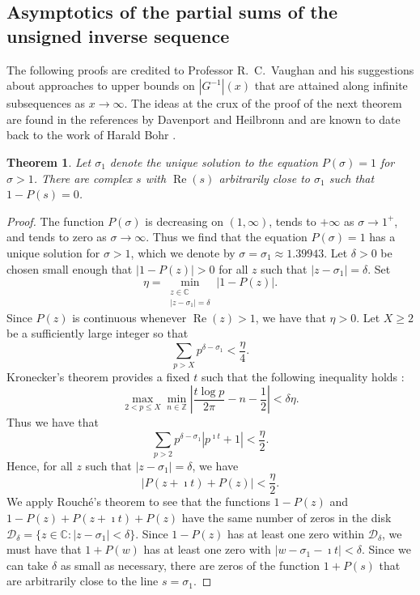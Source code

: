 \documentclass[11pt,reqno,a4letter]{article}
\numberwithin{figure}{section}
\numberwithin{table}{section}
\newcommand{\cf}{\textit{cf.\ }}
\theoremstyle{plain}
\newtheorem{theorem}{Theorem}
\numberwithin{theorem}{section}
\theoremstyle{definition}
\renewcommand{\Re}{\operatorname{Re}}
\begin{document}
\subsection{Asymptotics of the partial sums of the unsigned inverse sequence} 
\label{subSection_AsymptoticsOfGinvx} 

The following proofs are credited to Professor R.~C.~Vaughan and his suggestions 
about approaches to upper bounds on $|G^{-1}|(x)$ that are attained 
along infinite subsequences as $x \rightarrow \infty$. 
The ideas at the crux of the proof of the next theorem 
are found in the references by Davenport and Heilbronn \cite{DAVHEIL-1936A,DAVHEIL-1936B} 
and are known to date back to the work of 
Harald Bohr \cite[\cf \S 11]{TITCHMARSH}. 

\begin{theorem}
\label{theorem_VaughanGrowthOfGInvxAndZerosOfPrimeZetaFunc_v1}
Let $\sigma_1$ denote the unique solution to the equation 
$P(\sigma) = 1$ for $\sigma > 1$. 
There are complex $s$ with $\Re(s)$ arbitrarily close to $\sigma_1$
such that $1-P(s) = 0$. 
\end{theorem}
\begin{proof}
The function $P(\sigma)$ is decreasing on $(1, \infty)$, 
tends to $+\infty$ as $\sigma \rightarrow 1^{+}$, and tends to zero as 
$\sigma \rightarrow \infty$. Thus we find that the equation $P(\sigma) = 1$ 
has a unique solution for $\sigma > 1$, which we denote by 
$\sigma = \sigma_1 \approx 1.39943$. 
Let $\delta > 0$ be chosen small enough that $|1-P(z)| > 0$ for all 
$z$ such that $|z-\sigma_1| = \delta$. Set 
\[
\eta = \min_{\substack{z \in \mathbb{C} \\ |z-\sigma_1|=\delta}} |1-P(z)|. 
\]
Since $P(z)$ is continuous whenever $\Re(z) > 1$, we have that 
$\eta > 0$. 
Let $X \geq 2$ be a sufficiently large integer so that 
\[
\sum_{p > X} p^{\delta-\sigma_1} < \frac{\eta}{4}. 
\]
Kronecker's theorem provides a fixed $t$ such that the 
following inequality holds \cite[\S XXIII]{HARDYWRIGHT}: 
\[
\max_{2 < p \leq X} \min_{n \in \mathbb{Z}} \left\lvert 
     \frac{t \log p}{2\pi} - n - \frac{1}{2} \right\rvert < \delta\eta. 
\]
Thus we have that 
\[
\sum_{p > 2} p^{\delta-\sigma_1} \left\lvert p^{\imath t} + 1 \right\rvert < 
     \frac{\eta}{2}. 
\]
Hence, for all $z$ such that $|z-\sigma_1|=\delta$, we have 
\[
\left\lvert P(z+\imath t) + P(z) \right\rvert < \frac{\eta}{2}. 
\]
We apply Rouch\'{e}'s theorem to see that the functions 
$1-P(z)$ and $1-P(z) + P(z+\imath t) + P(z)$ have the same number of zeros in 
the disk $\mathcal{D}_{\delta} = \{z \in \mathbb{C}: |z-\sigma_1| < \delta\}$. 
Since $1-P(z)$ has at least one zero within $\mathcal{D}_{\delta}$, we must have that 
$1+P(w)$ has at least one zero with $|w-\sigma_1-\imath t| < \delta$. 
Since we can take $\delta$ as small as necessary, 
there are zeros of the function $1+P(s)$ that are arbitrarily close to the 
line $s = \sigma_1$. 
\end{proof}
\end{document}
